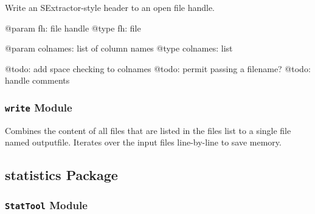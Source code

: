 \documentclass[letterpaper,10pt,english]{sphinxmanual}
\begin{document}

\begin{fulllineitems}
\label{SamPy.smnIO:SamPy.smnIO.sextutils.writeheader}
Write an SExtractor-style header to an open file handle.

@param fh: file handle
@type fh: file

@param colnames: list of column names
@type colnames: list

@todo: add space checking to colnames
@todo: permit passing a filename?
@todo: handle comments

\end{fulllineitems}



\subsubsection{\texttt{write} Module}
\label{SamPy.smnIO:module-SamPy.smnIO.write}\label{SamPy.smnIO:write-module}

\begin{fulllineitems}
\label{SamPy.smnIO:SamPy.smnIO.write.combineFiles}
Combines the content of all files that are listed
in the files list to a single file named outputfile.
Iterates over the input files line-by-line to save
memory.

\end{fulllineitems}



\subsection{statistics Package}
\label{SamPy.statistics:statistics-package}\label{SamPy.statistics::doc}

\subsubsection{\texttt{StatTool} Module}
\label{SamPy.statistics:module-SamPy.statistics.StatTool}\label{SamPy.statistics:stattool-module}
\end{document}
